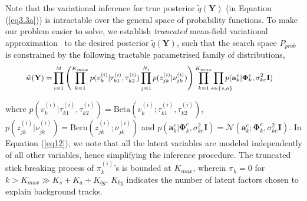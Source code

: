 \documentclass[runningheads]{llncs}
\begin{document}
Note that the variational inference for true posterior $\tilde{q}(\mathbf{Y})$ (in Equation (\ref{eq3.3a})) is intractable over the general space of probability functions. To make our problem easier to solve, we establish \textit{truncated} mean-field variational approximation~\cite{doshi2009variational} to the desired posterior $\tilde{q}(\mathbf{Y})$, such that the search space $P_{prob}$ is constrained by the following tractable parametrised family of distributions,
\begin{equation}{\small
\begin{aligned}
\label{eq12}
\tilde{w}(\mathbf{Y}) =& \prod_{i=1}^M \left(\prod_{k=1}^{K_{max}} p(v_k^{(i)} | \tau_{k1}^{(i)}, \tau_{k2}^{(i)}) \prod_{j=1}^{N_i} p(z_{jk}^{(i)} | \nu_{jk}^{(i)}) \right)
\prod_{k=1}^{K_{max}} \prod_{\mathclap{\,\,\,\,\,\,e\in\{s,a\}}} p(\mathbf{a}^e_{k}|\mathbf{\Phi}_k^e, \sigma_{ke}^2\mathbf{I}) 
\end{aligned}
}
\end{equation}

where $p(v_k^{(i)} | \tau_{k1}^{(i)}, \tau_{k2}^{(i)}) = \text{Beta}(v_k^{(i)}; \tau_{k1}^{(i)}, \tau_{k2}^{(i)})$, $p(z_{jk}^{(i)} | \nu_{jk}^{(i)}) = \text{Bern}(z_{jk}^{(i)}; \nu_{jk}^{(i)})$ and $p(\mathbf{a}^e_{k}|\mathbf{\Phi}_k^e, \sigma_{ke}^2\mathbf{I}) = \mathcal{N}(\mathbf{a}^e_{k}; \mathbf{\Phi}_k^e, \sigma_{ke}^2\mathbf{I})$. In Equation (\ref{eq12}), we note that all the latent variables are modeled independently of all other variables, hence simplifying the inference procedure. The truncated stick breaking process of $\pi_k^{(i)}$'s is bounded at $K_{max}$, wherein $\pi_k = 0$ for $k > K_{max} \gg K_s + K_a + K_{bg}$. $K_{bg}$ indicates the number of latent factors chosen to explain background tracks. 
\end{document}
